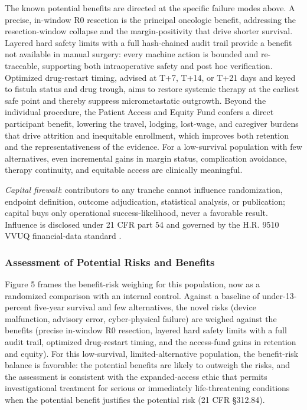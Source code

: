 The known potential benefits are directed at the specific failure modes above. A
precise, in-window R0 resection is the principal oncologic benefit, addressing the
resection-window collapse and the margin-positivity that drive shorter survival.
Layered hard safety limits with a full hash-chained audit trail provide a benefit
not available in manual surgery: every machine action is bounded and re-traceable,
supporting both intraoperative safety and post hoc verification. Optimized
drug-restart timing, advised at T+7, T+14, or T+21 days and keyed to fistula
status and drug trough, aims to restore systemic therapy at the earliest safe
point and thereby suppress micrometastatic outgrowth. Beyond the individual
procedure, the Patient Access and Equity Fund confers a direct participant
benefit, lowering the travel, lodging, lost-wage, and caregiver burdens that drive
attrition and inequitable enrollment, which improves both retention and the
representativeness of the evidence. For a low-survival population with few
alternatives, even incremental gains in margin status, complication avoidance,
therapy continuity, and equitable access are clinically meaningful.


\textit{Capital firewall}: contributors to any tranche cannot influence randomization, endpoint definition, outcome adjudication, statistical analysis, or publication; capital buys only operational success-likelihood, never a favorable result. Influence is disclosed under 21 CFR part 54 and governed by the H.R. 9510 VVUQ financial-data standard \cite{kawchak2026hr9510,ecfr2026part54}.

\vspace{-0.2cm}

\subsubsection{Assessment of Potential Risks and Benefits}

Figure 5 frames the benefit-risk weighing for this population, now as a randomized
comparison with an internal control. Against a baseline of under-13-percent
five-year survival and few alternatives, the novel risks (device malfunction,
advisory error, cyber-physical failure) are weighed against the benefits (precise
in-window R0 resection, layered hard safety limits with a full audit trail,
optimized drug-restart timing, and the access-fund gains in retention and equity).
For this low-survival, limited-alternative population, the benefit-risk balance is
favorable: the potential benefits are likely to outweigh the risks, and the
assessment is consistent with the expanded-access ethic that permits
investigational treatment for serious or immediately life-threatening conditions
when the potential benefit justifies the potential risk (21 CFR \S312.84).

